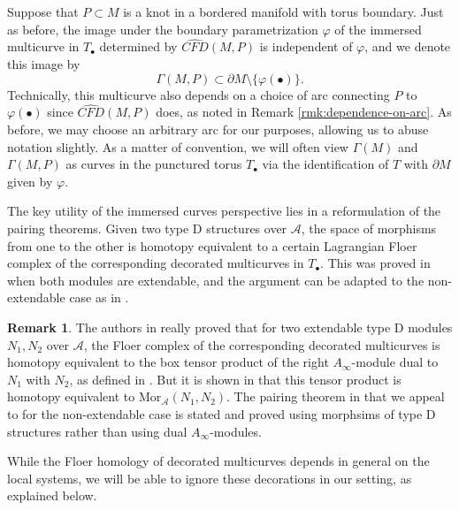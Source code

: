 \documentclass[11pt]{amsart}
\numberwithin{equation}{section}
\numberwithin{theorem}{section}
\theoremstyle{definition}
\newtheorem{remark}[theorem]{Remark}
\newcommand{\Mor}{\mathrm{Mor}}
\newcommand{\CFD}{\widehat{\mathit{CFD}}}
\newcommand{\Alg}{\mathcal{A}}
\begin{document}
Suppose that $P\subset M$ is a knot in a bordered  manifold with torus boundary. Just as before, the image under the boundary parametrization $\varphi$ of the immersed multicurve in $T_\bullet$ determined by  $\CFD(M,P)$ is independent of $\varphi$, and we denote this image by \[\Gamma(M, P)\subset \partial M\setminus \{\varphi(\bullet)\}.\] Technically, this multicurve also depends on a choice of arc connecting $P$ to $\varphi(\bullet)$ since $\CFD(M,P)$ does, as noted in Remark \ref{rmk:dependence-on-arc}.  As before, we may choose an arbitrary arc for our purposes, allowing us to abuse notation slightly.  As a matter of convention, we will often view $\Gamma(M)$ and $\Gamma(M,P)$ as curves in the punctured torus $T_{\bullet}$ via the identification of $T$ with $\partial M$ given by $\varphi$.

The key utility of the immersed curves perspective lies in a reformulation of the pairing theorems. Given two type D structures over $\Alg$, the space of morphisms from one to the other is homotopy equivalent to a certain Lagrangian Floer complex of the corresponding decorated multicurves in $T_\bullet$. This was proved in \cite{hrw} when both modules are extendable, and the argument can be adapted to the non-extendable case as in \cite[Theorem 5.22]{KWZ}. 

\begin{remark}
The authors in \cite{hrw} really proved that for two extendable type D modules $N_1,N_2$ over $\Alg$, the Floer complex of the corresponding decorated multicurves is homotopy equivalent to the box tensor product of the right $A_\infty$-module dual to $N_1$ with $N_2$, as defined in \cite{LOT}. But it is shown in \cite{LOT-morphism} that this tensor product is homotopy equivalent to $\Mor_\Alg(N_1,N_2)$. The pairing theorem in \cite{KWZ} that we appeal to for the non-extendable case is stated and proved using morphsims of type D structures rather than using dual $A_\infty$-modules.
\end{remark}

While the Floer homology of decorated multicurves depends in general on the local systems, we will be able to ignore these decorations in our setting, as explained below.
\end{document}
